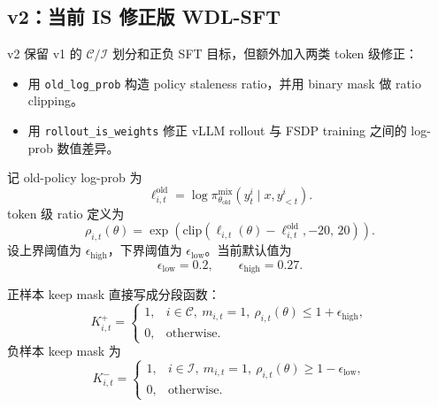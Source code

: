 \subsection{v2：当前 IS 修正版 WDL-SFT}
\label{subsec:v2}

v2 保留 v1 的 $\mathcal{C}/\mathcal{I}$ 划分和正负 SFT 目标，但额外加入两类 token 级修正：
\begin{itemize}
    \item 用 \texttt{old\_log\_prob} 构造 policy staleness ratio，并用 binary mask 做 ratio clipping。
    \item 用 \texttt{rollout\_is\_weights} 修正 vLLM rollout 与 FSDP training 之间的 log-prob 数值差异。
\end{itemize}

记 old-policy log-prob 为
\begin{equation}
    \ell^{\mathrm{old}}_{i,t}
    =
    \log \pi^{\mathrm{mix}}_{\theta_{\mathrm{old}}}
    \left(y^i_t\mid x,y^i_{<t}\right).
\end{equation}
token 级 ratio 定义为
\begin{equation}
    \rho_{i,t}(\theta)
    =
    \exp\!\left(
        \mathrm{clip}\left(
            \ell_{i,t}(\theta)-\ell^{\mathrm{old}}_{i,t},
            -20,\,
            20
        \right)
    \right).
    \label{eq:ratio}
\end{equation}
设上界阈值为 $\epsilon_{\mathrm{high}}$，下界阈值为 $\epsilon_{\mathrm{low}}$。当前默认值为
\begin{equation}
    \epsilon_{\mathrm{low}}=0.2,
    \qquad
    \epsilon_{\mathrm{high}}=0.27.
\end{equation}

正样本 keep mask 直接写成分段函数：
\begin{equation}
    K^+_{i,t}
    =
    \begin{cases}
        1,
        & i\in\mathcal{C},\ m_{i,t}=1,\ \rho_{i,t}(\theta)\le 1+\epsilon_{\mathrm{high}},\\
        0,
        & \text{otherwise}.
    \end{cases}
    \label{eq:pos_mask}
\end{equation}
负样本 keep mask 为
\begin{equation}
    K^-_{i,t}
    =
    \begin{cases}
        1,
        & i\in\mathcal{I},\ m_{i,t}=1,\ \rho_{i,t}(\theta)\ge 1-\epsilon_{\mathrm{low}},\\
        0,
        & \text{otherwise}.
    \end{cases}
    \label{eq:neg_mask}
\end{equation}

